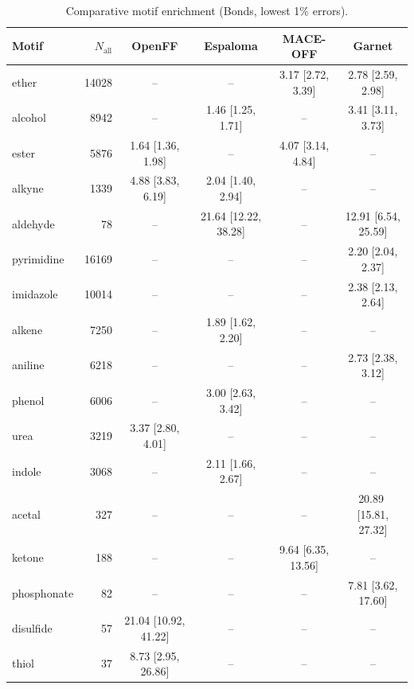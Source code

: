 \begin{table}[h!]
  \centering
  \small
  \setlength{\tabcolsep}{5pt}
  \renewcommand{\arraystretch}{1.15}
  \begin{tabular}{l r c c c c}
    \hline
    Motif & $N_\mathrm{all}$ & OpenFF & Espaloma & MACE-OFF & Garnet \\
    \hline
    ether & 14028 & -- & -- & 3.17\,\,[2.72, 3.39] & 2.78\,\,[2.59, 2.98] \\
    alcohol & 8942 & -- & 1.46\,\,[1.25, 1.71] & -- & 3.41\,\,[3.11, 3.73] \\
    ester & 5876 & 1.64\,\,[1.36, 1.98] & -- & 4.07\,\,[3.14, 4.84] & -- \\
    alkyne & 1339 & 4.88\,\,[3.83, 6.19] & 2.04\,\,[1.40, 2.94] & -- & -- \\
    aldehyde & 78 & -- & 21.64\,\,[12.22, 38.28] & -- & 12.91\,\,[6.54, 25.59] \\
    \hdashline
    pyrimidine & 16169 & -- & -- & -- & 2.20\,\,[2.04, 2.37] \\
    imidazole & 10014 & -- & -- & -- & 2.38\,\,[2.13, 2.64] \\
    alkene & 7250 & -- & 1.89\,\,[1.62, 2.20] & -- & -- \\
    aniline & 6218 & -- & -- & -- & 2.73\,\,[2.38, 3.12] \\
    phenol & 6006 & -- & 3.00\,\,[2.63, 3.42] & -- & -- \\
    urea & 3219 & 3.37\,\,[2.80, 4.01] & -- & -- & -- \\
    indole & 3068 & -- & 2.11\,\,[1.66, 2.67] & -- & -- \\
    acetal & 327 & -- & -- & -- & 20.89\,\,[15.81, 27.32] \\
    ketone & 188 & -- & -- & 9.64\,\,[6.35, 13.56] & -- \\
    phosphonate & 82 & -- & -- & -- & 7.81\,\,[3.62, 17.60] \\
    disulfide & 57 & 21.04\,\,[10.92, 41.22] & -- & -- & -- \\
    thiol & 37 & 8.73\,\,[2.95, 26.86] & -- & -- & -- \\
    \hline
  \end{tabular}
  \caption{Comparative motif enrichment (Bonds, lowest 1\% errors).}
  \label{tab:compare_bonds_best}
\end{table}